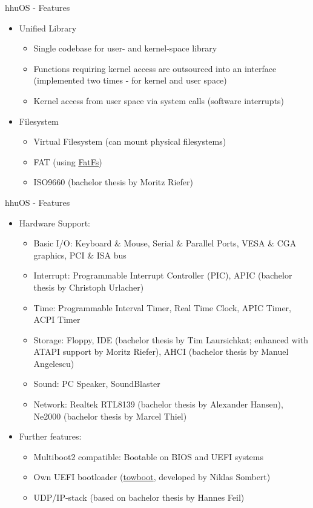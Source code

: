	\begin{frame}{hhuOS - Features}
		\begin{itemize}
			\item Unified Library
			\begin{itemize}
				\item Single codebase for user- and kernel-space library
				\item Functions requiring kernel access are outsourced into an interface (implemented two times - for kernel and user space)
				\item Kernel access from user space via system calls (software interrupts)
			\end{itemize}
			\vspace{1.0em}
			\item Filesystem
			\begin{itemize}
				\item Virtual Filesystem (can mount physical filesystems)
				\item FAT (using \href{http://elm-chan.org/fsw/ff/00index\_e.html}{FatFs})
				\item ISO9660 (bachelor thesis by Moritz Riefer)
			\end{itemize}
		\end{itemize}
	\end{frame}
	
	\begin{frame}{hhuOS - Features}
		\begin{itemize}
			\item Hardware Support:
			\begin{itemize}
				\item Basic I/O: Keyboard \& Mouse, Serial \& Parallel Ports, VESA \& CGA graphics, PCI \& ISA bus
				\item Interrupt: Programmable Interrupt Controller (PIC), APIC (bachelor thesis by Christoph Urlacher)
				\item Time: Programmable Interval Timer, Real Time Clock, APIC Timer, ACPI Timer
				\item Storage: Floppy, IDE (bachelor thesis by Tim Laursichkat; enhanced with ATAPI support by Moritz Riefer), AHCI (bachelor thesis by Manuel Angelescu)
				\item Sound: PC Speaker, SoundBlaster
				\item Network: Realtek RTL8139 (bachelor thesis by Alexander Hansen), Ne2000 (bachelor thesis by Marcel Thiel)
			\end{itemize}
			\item Further features:
			\begin{itemize}
				\item Multiboot2 compatible: Bootable on BIOS and UEFI systems
				\item Own UEFI bootloader (\href{https://github.com/hhuOS/towboot}{towboot}, developed by Niklas Sombert)
				\item UDP/IP-stack (based on bachelor thesis by Hannes Feil)
			\end{itemize}
		\end{itemize}
	\end{frame}